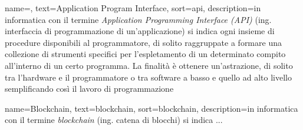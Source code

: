 
\renewcommand{\acronymname}{Acronimi e abbreviazioni}

    
    
    
	
	

	


\renewcommand{\glossaryname}{Glossario}

{
    name=,
    text=Application Program Interface,
    sort=api,
    description={in informatica con il termine \emph{Application Programming Interface (API)} (ing. interfaccia di programmazione di un'applicazione) si indica ogni insieme di procedure disponibili al programmatore, di solito raggruppate a formare una collezione di strumenti specifici per l'espletamento di un determinato compito all'interno di un certo programma. La finalità è ottenere un'astrazione, di solito tra l'hardware e il programmatore o tra software a basso e quello ad alto livello semplificando così il lavoro di programmazione}
}

{
	name=Blockchain,
	text=blockchain,
	sort=blockchain,
	description={in informatica con il termine \emph{blockchain} (ing. catena di blocchi) si indica ...}
}

